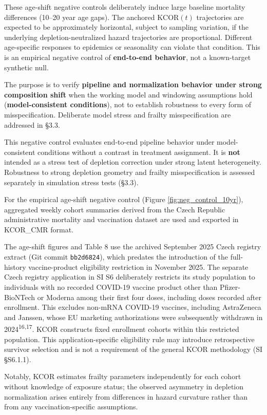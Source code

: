 \documentclass[
]{article}
\begin{document}
These age-shift negative controls deliberately induce large baseline mortality differences (10--20 year age gaps). The anchored \(\mathrm{KCOR}(t)\) trajectories are expected to be approximately horizontal, subject to sampling variation, if the underlying depletion-neutralized hazard trajectories are proportional. Different age-specific responses to epidemics or seasonality can violate that condition. This is an empirical negative control of \textbf{end-to-end behavior}, not a known-target synthetic null.

The purpose is to verify \textbf{pipeline and normalization behavior under strong composition shift} when the working model and windowing assumptions hold (\textbf{model-consistent conditions}), not to establish robustness to every form of misspecification. Deliberate model stress and frailty misspecification are addressed in §3.3.

This negative control evaluates end-to-end pipeline behavior under model-consistent conditions without a contrast in treatment assignment. It is \textbf{not} intended as a stress test of depletion correction under strong latent heterogeneity. Robustness to strong depletion geometry and frailty misspecification is assessed separately in simulation stress tests (§3.3).

For the empirical age-shift negative control (Figure \ref{fig:neg_control_10yr}), aggregated weekly cohort summaries derived from the Czech Republic administrative mortality and vaccination dataset are used and exported in KCOR\_CMR format.

The age-shift figures and Table 8 use the archived September 2025 Czech registry extract (Git commit \texttt{bb2d6824}), which predates the introduction of the full-history vaccine-product eligibility restriction in November 2025. The separate Czech registry application in SI S6 deliberately restricts its study population to individuals with no recorded COVID-19 vaccine product other than Pfizer-BioNTech or Moderna among their first four doses, including doses recorded after enrollment. This excludes non-mRNA COVID-19 vaccines, including AstraZeneca and Janssen, whose EU marketing authorizations were subsequently withdrawn in 2024\textsuperscript{16,17}. KCOR constructs fixed enrollment cohorts within this restricted population. This application-specific eligibility rule may introduce retrospective survivor selection and is not a requirement of the general KCOR methodology (SI §S6.1.1).

Notably, KCOR estimates frailty parameters independently for each cohort without knowledge of exposure status; the observed asymmetry in depletion normalization arises entirely from differences in hazard curvature rather than from any vaccination-specific assumptions.
\end{document}
